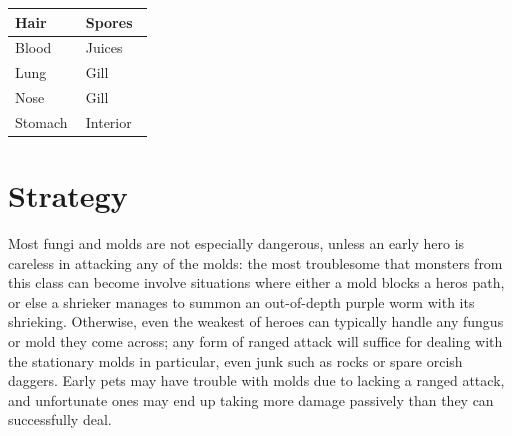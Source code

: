\begin{longtable}{|>{\RaggedRight}p{0.48005\linewidth}|>{\RaggedRight}p{0.46281\linewidth}|}
\hspace*{0pt}\ignorespaces{}\hspace*{0pt}Hair&\hspace*{0pt}\ignorespaces{}\hspace*{0pt}Spores\\ \hline \hspace*{0pt}\ignorespaces{}\hspace*{0pt}Blood&\hspace*{0pt}\ignorespaces{}\hspace*{0pt}Juices\\ \hline \hspace*{0pt}\ignorespaces{}\hspace*{0pt}Lung&\hspace*{0pt}\ignorespaces{}\hspace*{0pt}Gill\\ \hline \hspace*{0pt}\ignorespaces{}\hspace*{0pt}Nose&\hspace*{0pt}\ignorespaces{}\hspace*{0pt}Gill\\ \hline \hspace*{0pt}\ignorespaces{}\hspace*{0pt}Stomach&\hspace*{0pt}\ignorespaces{}\hspace*{0pt}Interior\\ \hline 
\end{longtable}

\section{Strategy}
\label{6}
Most fungi and molds are not especially dangerous, unless an early hero is careless in attacking any of the molds: the most troublesome that monsters from this class can become involve situations where either a mold blocks a hero\textquotesingle{}s path, or else a shrieker manages to summon an out-{}of-{}depth purple worm\footnotemark[49] with its shrieking. Otherwise, even the weakest of heroes can typically handle any fungus or mold they come across; any form of ranged attack\footnotemark[50] will suffice for dealing with the stationary molds in particular, even junk\footnotemark[51] such as rocks\footnotemark[52] or spare orcish daggers\footnotemark[53]. Early pets may have trouble with molds due to lacking a ranged attack, and unfortunate ones may end up taking more damage passively than they can successfully deal.


